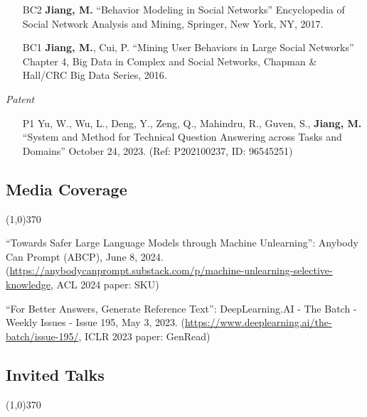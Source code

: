 \documentclass[10pt]{article}
\newenvironment{myindentpar}[1]%
{\begin{list}{}%
         {\setlength{\leftmargin}{#1}}%
         \item[]%
}
{\end{list}}
\newcounter{list}
\begin{document}
\begin{myindentpar}{0.00cm}
\begin{enumerate}[leftmargin=.5cm]
\item[BC2] \textbf{Jiang, M.} ``Behavior Modeling in Social Networks'' Encyclopedia of Social Network Analysis and Mining, Springer, New York, NY, 2017.
		
\item[BC1] \textbf{Jiang, M.}, Cui, P. ``Mining User Behaviors in Large Social Networks'' Chapter 4, Big Data in Complex and Social Networks, Chapman \& Hall/CRC Big Data Series, 2016.

\end{enumerate}

\hspace{-0.25cm}\textit{Patent}

\begin{enumerate}[leftmargin=.5cm]

\item[P1] Yu, W., Wu, L., Deng, Y., Zeng, Q., Mahindru, R., Guven, S., \textbf{Jiang, M.} ``System and Method for Technical Question Answering across Tasks and Domains'' October 24, 2023. (Ref: P202100237, ID: 96545251)

\end{enumerate}


\end{myindentpar}

\subsection{\sc Media Coverage}
\vspace{-0.4cm} \line(1,0){370} \vspace{-0.1cm}

\begin{myindentpar}{0.75cm}

\hspace{-0.75cm} ``Towards Safer Large Language Models through Machine Unlearning'': Anybody Can Prompt (ABCP), June 8, 2024. (\url{https://anybodycanprompt.substack.com/p/machine-unlearning-selective-knowledge}, ACL 2024 paper: SKU)

\hspace{-0.75cm} ``For Better Answers, Generate Reference Text'': DeepLearning.AI - The Batch - Weekly Issues - Issue 195, May 3, 2023. (\url{https://www.deeplearning.ai/the-batch/issue-195/}, ICLR 2023 paper: GenRead)

\end{myindentpar}

\subsection{\sc Invited Talks}
\vspace{-0.4cm} \line(1,0){370} \vspace{-0.1cm}
\end{document}
